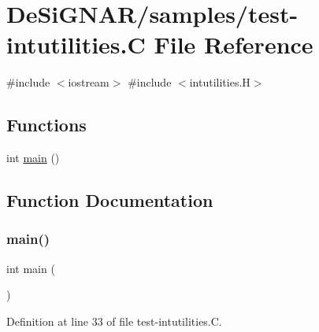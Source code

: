 \hypertarget{test-intutilities_8_c}{}\section{De\+Si\+G\+N\+A\+R/samples/test-\/intutilities.C File Reference}
\label{test-intutilities_8_c}
{\ttfamily \#include $<$iostream$>$}\newline
{\ttfamily \#include $<$intutilities.\+H$>$}\newline
\subsection*{Functions}
\begin{DoxyCompactItemize}
\item 
int \hyperlink{test-intutilities_8_c_ae66f6b31b5ad750f1fe042a706a4e3d4}{main} ()
\end{DoxyCompactItemize}


\subsection{Function Documentation}
\mbox{\label{test-intutilities_8_c_ae66f6b31b5ad750f1fe042a706a4e3d4}} 
\subsubsection{\texorpdfstring{main()}{main()}}
{\footnotesize\ttfamily int main (\begin{DoxyParamCaption}{ }\end{DoxyParamCaption})}



Definition at line 33 of file test-\/intutilities.\+C.

